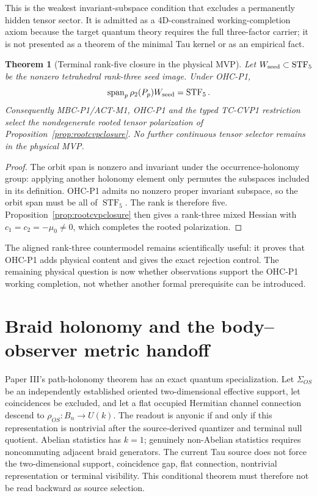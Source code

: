 \documentclass[11pt]{article}
\newtheorem{theorem}{Theorem}
\begin{document}
This is the weakest invariant-subspace condition that excludes a permanently
hidden tensor sector. It is admitted as a 4D-constrained working-completion
axiom because the target quantum theory requires the full three-factor
carrier; it is not presented as a theorem of the minimal Tau kernel or as an
empirical fact.

\begin{theorem}[Terminal rank-five closure in the physical MVP]
\label{thm:ohcrankfive}
Let $W_{\rm seed}\subset\operatorname{STF}_5$ be the nonzero tetrahedral
rank-three seed image. Under OHC-P1,
\begin{equation}
 \operatorname{span}_p\rho_2(P_p)W_{\rm seed}
 =\operatorname{STF}_5.
\end{equation}
Consequently MBC-P1/ACT-M1, OHC-P1 and the typed TC-CVP1 restriction select
the nondegenerate rooted tensor polarization of
Proposition~\ref{prop:rootcvpclosure}. No further continuous tensor selector
remains in the physical MVP.
\end{theorem}

\begin{proof}
The orbit span is nonzero and invariant under the occurrence-holonomy group:
applying another holonomy element only permutes the subspaces included in its
definition. OHC-P1 admits no nonzero proper invariant subspace, so the orbit
span must be all of $\operatorname{STF}_5$. The rank is therefore five.
Proposition~\ref{prop:rootcvpclosure} then gives a rank-three mixed Hessian
with $c_1=c_2=-\mu_0\ne0$, which completes the rooted polarization.
\end{proof}

The aligned rank-three countermodel remains scientifically useful: it proves
that OHC-P1 adds physical content and gives the exact rejection control. The
remaining physical question is now whether observations support the OHC-P1 working
completion, not whether another formal prerequisite can be introduced.

\section{Braid holonomy and the body--observer metric handoff}

Paper III's path-holonomy theorem has an exact quantum specialization.  Let
$\Sigma_{OS}$ be an independently established oriented two-dimensional
effective support, let coincidences be excluded, and let a flat occupied
Hermitian channel connection descend to $\rho_{OS}:B_n\to U(k)$.  The readout
is anyonic if and only if this representation is nontrivial after the
source-derived quantizer and terminal null quotient.  Abelian statistics has
$k=1$; genuinely non-Abelian statistics requires noncommuting adjacent braid
generators.  The current Tau source does not force the two-dimensional
support, coincidence gap, flat connection, nontrivial representation or
terminal visibility.  This conditional theorem must therefore not be read
backward as source selection.
\end{document}
